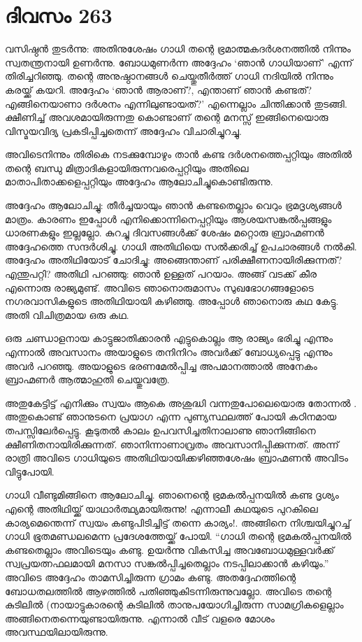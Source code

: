 \section{ദിവസം 263}


വസിഷ്ഠന്‍ തുടര്‍ന്നു: അതിനുശേഷം ഗാധി തന്റെ ഭ്രമാത്മകദര്‍ശനത്തില്‍ നിന്നും സ്വതന്ത്രനായി ഉണര്‍ന്നു. ബോധമുണര്‍ന്ന അദ്ദേഹം ‘ഞാന്‍ ഗാധിയാണ്’ എന്ന് തിരിച്ചറിഞ്ഞു. തന്റെ അനുഷ്ഠാനങ്ങള്‍ ചെയ്തുതീര്‍ത്ത് ഗാധി നദിയില്‍ നിന്നും കരയ്ക്ക്‌ കയറി. അദ്ദേഹം ‘ഞാന്‍ ആരാണ്?, എന്താണ് ഞാന്‍ കണ്ടത്? എങ്ങിനെയാണാ ദര്‍ശനം എന്നിലുണ്ടായത്?’ എന്നെല്ലാം ചിന്തിക്കാന്‍ തുടങ്ങി. ക്ഷീണിച്ച് അവശമായിരുന്നതു കൊണ്ടാണ് തന്റെ മനസ്സ് ഇങ്ങിനെയൊരു വിസ്മയവിദ്യ പ്രകടിപ്പിച്ചതെന്ന് അദ്ദേഹം വിചാരിച്ചുറച്ചു.

അവിടെനിന്നും തിരികെ നടക്കുമ്പോഴും താന്‍ കണ്ട ദര്‍ശനത്തെപ്പറ്റിയും അതില്‍ തന്റെ ബന്ധു മിത്രാദികളായിരുന്നവരെപ്പറ്റിയും അതിലെ മാതാപിതാക്കളെപ്പറ്റിയും അദ്ദേഹം ആലോചിച്ചുകൊണ്ടിരുന്നു.

അദ്ദേഹം ആലോചിച്ചു: തീര്‍ച്ചയായും ഞാന്‍ കണ്ടതെല്ലാം വെറും ഭ്രമദൃശ്യങ്ങള്‍ മാത്രം. കാരണം ഇപ്പോള്‍ എനിക്കൊന്നിനെപ്പറ്റിയും ആശയസങ്കല്‍പ്പങ്ങളും ധാരണകളും ഇല്ലല്ലോ. കുറച്ചു ദിവസങ്ങള്‍ക്ക് ശേഷം മറ്റൊരു ബ്രാഹ്മണന്‍ അദ്ദേഹത്തെ സന്ദര്‍ശിച്ചു. ഗാധി അതിഥിയെ സല്‍ക്കരിച്ച് ഉപചാരങ്ങള്‍ നല്‍കി. അദ്ദേഹം അതിഥിയോട് ചോദിച്ചു: അങ്ങെന്താണ് പരിക്ഷീണനായിരിക്കുന്നത്? എന്തുപറ്റി? അതിഥി പറഞ്ഞു: ഞാന്‍ ഉള്ളത് പറയാം. അങ്ങ് വടക്ക് കീര എന്നൊരു രാജ്യമുണ്ട്. അവിടെ ഞാനൊരുമാസം സുഖഭോഗങ്ങളോടെ നഗരവാസികളുടെ അതിഥിയായി കഴിഞ്ഞു. അപ്പോള്‍ ഞാനൊരു കഥ കേട്ടു. അതി വിചിത്രമായ ഒരു കഥ.

ഒരു ചണ്ഡാളനായ കാട്ടുജാതിക്കാരന്‍ എട്ടുകൊല്ലം ആ രാജ്യം ഭരിച്ചു എന്നും എന്നാല്‍ അവസാനം അയാളുടെ തനിനിറം അവര്‍ക്ക് ബോധ്യപ്പെട്ടു എന്നും അവര്‍ പറഞ്ഞു. അയാളുടെ ഭരണമേല്‍പ്പിച്ച അപമാനത്താല്‍ അനേകം ബ്രാഹ്മണര്‍ ആത്മാഹുതി ചെയ്തുവത്രേ.

അതുകേട്ടിട്ട് എനിക്കും സ്വയം ആകെ അശുദ്ധി വന്നതുപോലെയൊരു തോന്നല്‍ . അതുകൊണ്ട് ഞാനുടനെ പ്രയാഗ എന്ന പുണ്യസ്ഥലത്ത് പോയി കഠിനമായ തപസ്സിലേര്‍പ്പെട്ടു. കൂടുതല്‍ കാലം ഉപവസിച്ചതിനാലാണു ഞാനിങ്ങിനെ ക്ഷീണിതനായിരിക്കുന്നത്. ഞാനിന്നാണാവ്രതം അവസാനിപ്പിക്കുന്നത്. അന്ന് രാത്രി അവിടെ ഗാധിയുടെ അതിഥിയായിക്കഴിഞ്ഞശേഷം ബ്രാഹ്മണന്‍ അവിടം വിട്ടുപോയി.

ഗാധി വീണ്ടുമിങ്ങിനെ ആലോചിച്ചു. ഞാനെന്റെ ഭ്രമകല്‍പ്പനയില്‍ കണ്ട ദൃശ്യം എന്റെ അതിഥിയ്ക്ക് യാഥാര്‍ത്ഥ്യമായിരുന്നു! എന്നാലീ കഥയുടെ പുറകിലെ കാര്യമെന്തെന്ന് സ്വയം കണ്ടുപിടിച്ചിട്ട് തന്നെ കാര്യം!. അങ്ങിനെ നിശ്ചയിച്ചുറച്ച് ഗാധി ഭൂതമണ്ഡലമെന്ന പ്രദേശത്തേയ്ക്ക് പോയി. “ഗാധി തന്റെ ഭ്രമകല്‍പ്പനയില്‍ കണ്ടതെല്ലാം അവിടെയും കണ്ടു. ഉയര്‍ന്നു വികസിച്ച അവബോധമുള്ളവര്‍ക്ക് സ്വപ്രയത്നഫലമായി മനസാ സങ്കല്‍പ്പിച്ചതെല്ലാം നടപ്പിലാക്കാന്‍ കഴിയും.” അവിടെ അദ്ദേഹം താമസിച്ചിരുന്ന ഗ്രാമം കണ്ടു. അതദ്ദേഹത്തിന്റെ ബോധതലത്തില്‍ ആഴത്തില്‍ പതിഞ്ഞുകിടന്നിരുന്നുവല്ലോ. അവിടെ തന്റെ കുടിലില്‍ (നായാട്ടുകാരന്റെ കുടിലില്‍ താനുപയോഗിച്ചിരുന്ന സാമഗ്രികളെല്ലാം അങ്ങിനെതന്നെയുണ്ടായിരുന്നു. എന്നാല്‍ വീട് വളരെ മോശം അവസ്ഥയിലായിരുന്നു. 

